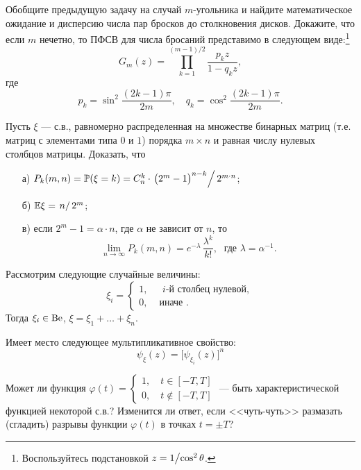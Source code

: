 \begin{problem}
Обобщите предыдущую задачу на случай $m$-угольника и найдите 
математическое ожидание и дисперсию числа пар бросков до столкновения 
дисков. Докажите, что если $m$ нечетно, то ПФСВ для числа бросаний 
представимо в следующем виде:\footnote{ Воспользуйтесь подстановкой $z=1 
\mathord{\left/ {\vphantom {1 {\cos ^2\theta }}} \right. 
\kern-\nulldelimiterspace} {\cos ^2\theta }$.}
\[
G_m (z)=\prod\limits_{k=1}^{(m-1)/2} {\frac{p_k z}{1-q_k z}} ,
\]
где
\[
p_k =\sin ^2\frac{(2k-1)\pi }{2m},
\quad
q_k =\cos ^2\frac{(2k-1)\pi }{2m}.
\]
\end{problem}



\begin{problem}
Пусть $\xi$ --- с.в., равномерно распределенная на множестве бинарных матриц (т.е. матриц с элементами типа $0$ и $1$) порядка 
$m\times n$ и равная числу нулевых столбцов матрицы. Доказать, что 
\begin{enumerate}
\item[а)] $P_k(m,n)={\mathbb P}(\xi=k)=C_n^k\cdot \left.\bigl( 2^m -1\bigr)^{n-k}\right/ 2^{m\cdot n}$; 

\item[б)] ${\mathbb E}\xi=\left. n\right/2^m$; 
\item[в)] если $2^m-1=\alpha\cdot n$, где $\alpha$ не зависит от $n$, то 
$$
\lim\limits_{n\to\infty} P_k(m,n)=e^{-\lambda}\, \frac{\lambda^k}{k!} ,\; \text{ где } \lambda=\alpha^{-1} .
$$
\end{enumerate}
\end{problem}

\begin{ordre}

Рассмотрим следующие случайные величины: 
$$
\xi_i=\begin{cases}
1, & \text{ $i$-й столбец нулевой}, \\
0, & \text{ иначе }.
\end{cases} 
$$
Тогда $\xi_i\in\mathrm{Be}$, $\xi=\xi_1+\ldots +\xi_n$. 

Имеет место следующее мультипликативное свойство:
$$
\psi_{\xi}(z)=\bigl[\psi_{\xi_i}(z)\bigr]^n
$$

\end{ordre}


\begin{problem}
Может ли функция $\varphi(t)=\begin{cases}1,\quad t\in[-T,T]\\
0,\quad t\notin[-T,T] \end{cases}$ --- 
быть характеристической функцией некоторой с.в.? Изменится ли ответ, если <<чуть-чуть>> размазать (сгладить) разрывы функции 
$\varphi(t)$ в точках $t=\pm T$? 
\end{problem}

